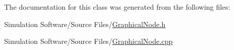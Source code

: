 The documentation for this class was generated from the following files\+:\begin{DoxyCompactItemize}
\item 
Simulation Software/\+Source Files/\hyperlink{_graphical_node_8h}{Graphical\+Node.\+h}\item 
Simulation Software/\+Source Files/\hyperlink{_graphical_node_8cpp}{Graphical\+Node.\+cpp}\end{DoxyCompactItemize}
